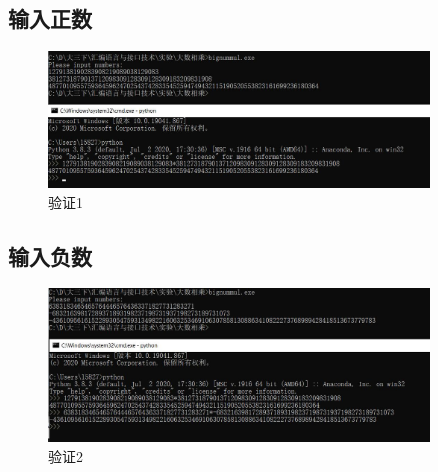 \subsection{输入正数}
\begin{figure}[H]
    \centering
    \includegraphics[width= 0.9\textwidth]{assets/大数乘法1}
    \caption{验证1}
    \label{验证1}
\end{figure}
\subsection{输入负数}
\begin{figure}[H]
    \centering
    \includegraphics[width= 0.9\textwidth]{assets/大数乘法2}
    \caption{验证2}
    \label{验证2}
\end{figure}

